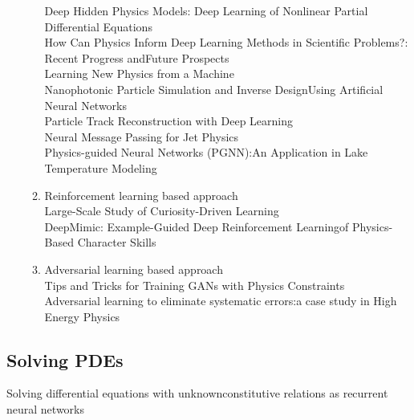 \documentclass[conference]{IEEEtran}
\begin{document}
\begin{enumerate}
\begin{enumerate}
      Deep Hidden Physics Models:  Deep Learning of Nonlinear Partial Differential Equations \cite{raissi2018deep} \\
      How Can Physics Inform Deep Learning Methods in Scientific Problems?: Recent Progress andFuture Prospects \cite{karpatne2017nips} \\
      Learning New Physics from a Machine \cite{d'agnolo2018learning}\\
      Nanophotonic Particle Simulation and Inverse DesignUsing Artificial Neural Networks \cite{Peurifoyeaar4206}\\
      Particle Track Reconstruction with Deep Learning \cite{farrell2017nips}\\
      Neural Message Passing for Jet Physics \cite{henrion2017nips}\\
      Physics-guided Neural Networks (PGNN):An Application in Lake Temperature Modeling \cite{karpatne2017physics-guided} \\
    \item Reinforcement learning based approach \\
      Large-Scale Study of Curiosity-Driven Learning \cite{burda2018large-scale}\\
      DeepMimic: Example-Guided Deep Reinforcement Learningof Physics-Based Character Skills \cite{peng2018deepmimic} \\
    \item Adversarial learning based approach \\
      Tips and Tricks for Training GANs with Physics Constraints \cite{oliveria2017nips} \\
      Adversarial learning to eliminate systematic errors:a case study in High Energy Physics \cite{estrade2017nips} \\
  \end{enumerate}

\end{enumerate}

\subsection{Solving PDEs}
Solving differential equations with unknownconstitutive relations as recurrent neural networks \\
\end{document}
